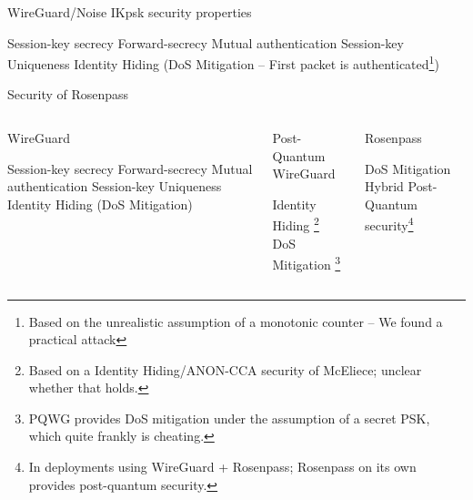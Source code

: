 \begin{frame}{WireGuard/Noise IKpsk security properties}
\begin{itemize}
  \itemtick Session-key secrecy
  \itemtick Forward-secrecy
  \itemtick Mutual authentication
  \itemtick Session-key Uniqueness
  \itemtick Identity Hiding
  \itemtick (DoS Mitigation – First packet is authenticated\footnote{Based on the unrealistic assumption of a monotonic counter – We found a practical attack})
\end{itemize}
\end{frame}

\begin{frame}{Security of Rosenpass}
\begin{columns}

\begin{column}{.30\textwidth}
WireGuard
\begin{itemize}
  \itemtick Session-key secrecy
  \itemtick Forward-secrecy
  \itemtick Mutual authentication
  \itemtick Session-key Uniqueness
  \itemtick Identity Hiding
  \itemtick (DoS Mitigation)
\end{itemize}
\end{column}

\begin{column}{.30\textwidth}
Post-Quantum WireGuard
\begin{itemize}
  \itemfail Identity Hiding \footnote{Based on a Identity Hiding/ANON-CCA security of McEliece; unclear whether that holds.}
  \itemfail DoS Mitigation \footnote{PQWG provides DoS mitigation under the assumption of a secret PSK, which quite frankly is cheating.}
\end{itemize}
\end{column}

\begin{column}{.30\textwidth}
Rosenpass
\begin{itemize}
  \itemtick DoS Mitigation
  \itemtick Hybrid Post-Quantum security\footnote{In deployments using WireGuard + Rosenpass; Rosenpass on its own provides post-quantum security.}
\end{itemize}
\end{column}

\end{columns}
\end{frame}

